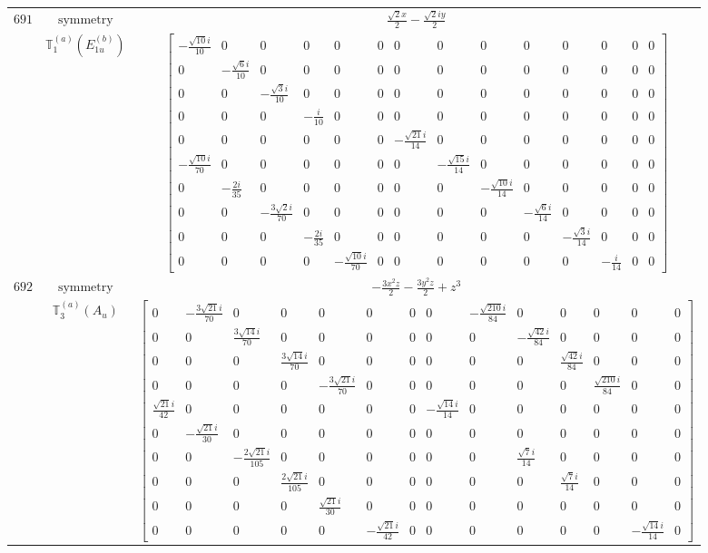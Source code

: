\documentclass[fleqn,8pt,landscape]{jsarticle}
\begin{document}
\begin{longtable}{ccc}
$ 691 $ & $ \text{symmetry} $ & $ \frac{\sqrt{2} x}{2} - \frac{\sqrt{2} i y}{2} $ \\
$  $ & $ \mathbb{T}_{1}^{(a)}(E_{1u}^{(b)}) $ & $ \begin{bmatrix} - \frac{\sqrt{10} i}{10} & 0 & 0 & 0 & 0 & 0 & 0 & 0 & 0 & 0 & 0 & 0 & 0 & 0 \\ 0 & - \frac{\sqrt{6} i}{10} & 0 & 0 & 0 & 0 & 0 & 0 & 0 & 0 & 0 & 0 & 0 & 0 \\ 0 & 0 & - \frac{\sqrt{3} i}{10} & 0 & 0 & 0 & 0 & 0 & 0 & 0 & 0 & 0 & 0 & 0 \\ 0 & 0 & 0 & - \frac{i}{10} & 0 & 0 & 0 & 0 & 0 & 0 & 0 & 0 & 0 & 0 \\ 0 & 0 & 0 & 0 & 0 & 0 & - \frac{\sqrt{21} i}{14} & 0 & 0 & 0 & 0 & 0 & 0 & 0 \\ - \frac{\sqrt{10} i}{70} & 0 & 0 & 0 & 0 & 0 & 0 & - \frac{\sqrt{15} i}{14} & 0 & 0 & 0 & 0 & 0 & 0 \\ 0 & - \frac{2 i}{35} & 0 & 0 & 0 & 0 & 0 & 0 & - \frac{\sqrt{10} i}{14} & 0 & 0 & 0 & 0 & 0 \\ 0 & 0 & - \frac{3 \sqrt{2} i}{70} & 0 & 0 & 0 & 0 & 0 & 0 & - \frac{\sqrt{6} i}{14} & 0 & 0 & 0 & 0 \\ 0 & 0 & 0 & - \frac{2 i}{35} & 0 & 0 & 0 & 0 & 0 & 0 & - \frac{\sqrt{3} i}{14} & 0 & 0 & 0 \\ 0 & 0 & 0 & 0 & - \frac{\sqrt{10} i}{70} & 0 & 0 & 0 & 0 & 0 & 0 & - \frac{i}{14} & 0 & 0 \end{bmatrix} $ \\ \hline
$ 692 $ & $ \text{symmetry} $ & $ - \frac{3 x^{2} z}{2} - \frac{3 y^{2} z}{2} + z^{3} $ \\
$  $ & $ \mathbb{T}_{3}^{(a)}(A_{u}) $ & $ \begin{bmatrix} 0 & - \frac{3 \sqrt{21} i}{70} & 0 & 0 & 0 & 0 & 0 & 0 & - \frac{\sqrt{210} i}{84} & 0 & 0 & 0 & 0 & 0 \\ 0 & 0 & \frac{3 \sqrt{14} i}{70} & 0 & 0 & 0 & 0 & 0 & 0 & - \frac{\sqrt{42} i}{84} & 0 & 0 & 0 & 0 \\ 0 & 0 & 0 & \frac{3 \sqrt{14} i}{70} & 0 & 0 & 0 & 0 & 0 & 0 & \frac{\sqrt{42} i}{84} & 0 & 0 & 0 \\ 0 & 0 & 0 & 0 & - \frac{3 \sqrt{21} i}{70} & 0 & 0 & 0 & 0 & 0 & 0 & \frac{\sqrt{210} i}{84} & 0 & 0 \\ \frac{\sqrt{21} i}{42} & 0 & 0 & 0 & 0 & 0 & 0 & - \frac{\sqrt{14} i}{14} & 0 & 0 & 0 & 0 & 0 & 0 \\ 0 & - \frac{\sqrt{21} i}{30} & 0 & 0 & 0 & 0 & 0 & 0 & 0 & 0 & 0 & 0 & 0 & 0 \\ 0 & 0 & - \frac{2 \sqrt{21} i}{105} & 0 & 0 & 0 & 0 & 0 & 0 & \frac{\sqrt{7} i}{14} & 0 & 0 & 0 & 0 \\ 0 & 0 & 0 & \frac{2 \sqrt{21} i}{105} & 0 & 0 & 0 & 0 & 0 & 0 & \frac{\sqrt{7} i}{14} & 0 & 0 & 0 \\ 0 & 0 & 0 & 0 & \frac{\sqrt{21} i}{30} & 0 & 0 & 0 & 0 & 0 & 0 & 0 & 0 & 0 \\ 0 & 0 & 0 & 0 & 0 & - \frac{\sqrt{21} i}{42} & 0 & 0 & 0 & 0 & 0 & 0 & - \frac{\sqrt{14} i}{14} & 0 \end{bmatrix} $ \\ \hline

\end{longtable}
\end{document}
